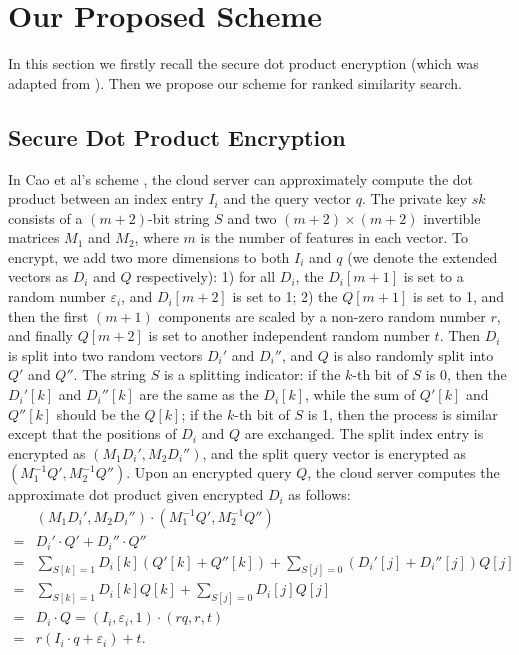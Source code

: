 \documentclass{article}
\begin{document}
\section{Our Proposed Scheme}
In this section we firstly recall the secure dot product encryption \cite{Cao14} (which was adapted from \cite{Wong09}). Then we propose our scheme for ranked similarity search.

\subsection{Secure Dot Product Encryption}
In Cao et al's scheme \cite{Cao14}, the cloud server can approximately compute the dot product between an index entry $I_i$ and the query vector $q$. The private key $sk$ consists of a $(m+2)$-bit string $S$ and two $(m+2)\times (m+2)$ invertible matrices $M_1$ and $M_2$, where $m$ is the number of features in each vector. To encrypt, we add two more dimensions to both $I_i$ and $q$ (we denote the extended vectors as $D_i$ and $Q$ respectively): 1) for all $D_i$, the $D_i[m+1]$ is set to a random number $\varepsilon_i$, and $D_i[m+2]$ is set to 1; 2) the $Q[m+1]$ is set to 1, and then the first $(m+1)$ components are scaled by a non-zero random number $r$, and finally $Q[m+2]$ is set to another independent random number $t$. Then $D_i$ is split into two random vectors $D_i'$ and $D_i''$, and $Q$ is also randomly split into $Q'$ and $Q''$. The string $S$ is a splitting indicator: if the $k$-th bit of $S$ is 0, then the $D_i'[k]$ and $D_i''[k]$ are the same as the $D_i[k]$, while the sum of $Q'[k]$ and $Q''[k]$ should be the $Q[k]$; if the $k$-th bit of $S$ is 1, then the process is similar except that the positions of $D_i$ and $Q$ are exchanged. The split index entry is encrypted as $(M_1D_i', M_2D_i'')$, and the split query vector is encrypted as $(M_1^{-1}Q', M_2^{-1}Q'')$. Upon an encrypted query $Q$, the cloud server computes the approximate dot product given encrypted $D_i$ as follows:
\begin{equation*}
\begin{aligned}
&(M_1D_i', M_2D_i'')\cdot(M_1^{-1}Q', M_2^{-1}Q'') \\
=&D_i'\cdot Q' + D_i''\cdot Q''\\
=&\sum_{S[k]=1}D_i[k](Q'[k] + Q''[k]) + \sum_{S[j]=0} (D_i'[j]+ D_i''[j])Q[j]\\
=&\sum_{S[k]=1}D_i[k]Q[k] + \sum_{S[j]=0} D_i[j]Q[j]\\
=&D_i \cdot Q = (I_i,\varepsilon_i,1)\cdot (rq,r,t)\\
=&r(I_i\cdot q+\varepsilon_i)+t.
\end{aligned}
\end{equation*}
\end{document}
